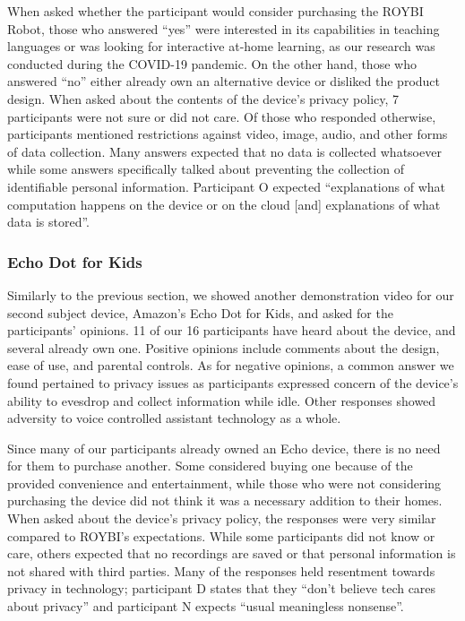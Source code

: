 \documentclass[12pt]{ucthesis}
\begin{document}
When asked whether the participant would consider purchasing the ROYBI Robot, those who answered ``yes'' were interested in its capabilities in teaching languages or was looking for interactive at-home learning, as our research was conducted during the COVID-19 pandemic. On the other hand, those who answered ``no'' either already own an alternative device or disliked the product design.
When asked about the contents of the device's privacy policy, 7 participants were not sure or did not care. Of those who responded otherwise, participants mentioned restrictions against video, image, audio, and other forms of data collection. Many answers expected that no data is collected whatsoever while some answers specifically talked about preventing the collection of identifiable personal information. Participant O expected ``explanations of what computation happens on the device or on the cloud [and] explanations of what data is stored''.

\subsubsection{Echo Dot for Kids}
Similarly to the previous section, we showed another demonstration video for our second subject device, Amazon's Echo Dot for Kids, and asked for the participants' opinions. 11 of our 16 participants have heard about the device, and several already own one. Positive opinions include comments about the design, ease of use, and parental controls. As for negative opinions, a common answer we found pertained to privacy issues as participants expressed concern of the device's ability to evesdrop and collect information while idle. Other responses showed adversity to voice controlled assistant technology as a whole. 

Since many of our participants already owned an Echo device, there is no need for them to purchase another. Some considered buying one because of the provided convenience and entertainment, while those who were not considering purchasing the device did not think it was a necessary addition to their homes. When asked about the device's privacy policy, the responses were very similar compared to ROYBI's expectations. While some participants did not know or care, others expected that no recordings are saved or that personal information is not shared with third parties. Many of the responses held resentment towards privacy in technology; participant D states that they ``don't believe tech cares about privacy'' and participant N expects ``usual meaningless nonsense''.
\end{document}
